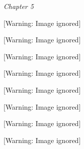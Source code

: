 
\clearpage\setcounter{page}{1}\pagestyle{Standard}
\thispagestyle{FirstPage}
{\centering
\textit{Chapter 5}
\par}

\begin{center}
 [Warning: Image ignored] %

\end{center}
\begin{center}
 [Warning: Image ignored] %

\end{center}
\begin{center}
 [Warning: Image ignored] %

\end{center}
\begin{center}
 [Warning: Image ignored] %

\end{center}
\begin{center}
 [Warning: Image ignored] %

\end{center}
\begin{center}
 [Warning: Image ignored] %

\end{center}
\begin{center}
 [Warning: Image ignored] %

\end{center}
\begin{center}
 [Warning: Image ignored] %

\end{center}
